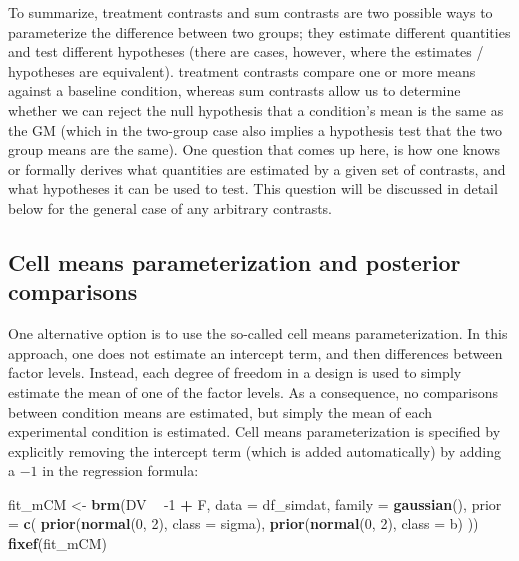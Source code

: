 \documentclass[12pt,]{krantz}
\newenvironment{Shaded}{\begin{snugshade}}{\end{snugshade}}
\newcommand{\KeywordTok}[1]{\textcolor[rgb]{0.13,0.29,0.53}{\textbf{#1}}}
\newcommand{\DataTypeTok}[1]{\textcolor[rgb]{0.13,0.29,0.53}{#1}}
\newcommand{\DecValTok}[1]{\textcolor[rgb]{0.00,0.00,0.81}{#1}}
\newcommand{\StringTok}[1]{\textcolor[rgb]{0.31,0.60,0.02}{#1}}
\newcommand{\OperatorTok}[1]{\textcolor[rgb]{0.81,0.36,0.00}{\textbf{#1}}}
\newcommand{\NormalTok}[1]{#1}
\theoremstyle{definition}
\theoremstyle{definition}
\theoremstyle{definition}
\theoremstyle{remark}
\begin{document}
To summarize, treatment contrasts and sum contrasts are two possible
ways to parameterize the difference between two groups; they estimate
different quantities and test different hypotheses (there are cases,
however, where the estimates / hypotheses are equivalent). treatment
contrasts compare one or more means against a baseline condition,
whereas sum contrasts allow us to determine whether we can reject the
null hypothesis that a condition's mean is the same as the GM (which in
the two-group case also implies a hypothesis test that the two group
means are the same). One question that comes up here, is how one knows
or formally derives what quantities are estimated by a given set of
contrasts, and what hypotheses it can be used to test. This question
will be discussed in detail below for the general case of any arbitrary
contrasts.

\subsection{Cell means parameterization and posterior
comparisons}\label{cell-means-parameterization-and-posterior-comparisons}

One alternative option is to use the so-called cell means
parameterization. In this approach, one does not estimate an intercept
term, and then differences between factor levels. Instead, each degree
of freedom in a design is used to simply estimate the mean of one of the
factor levels. As a consequence, no comparisons between condition means
are estimated, but simply the mean of each experimental condition is
estimated. Cell means parameterization is specified by explicitly
removing the intercept term (which is added automatically) by adding a
\(-1\) in the regression formula:

\begin{Shaded}
\begin{Highlighting}[]
\NormalTok{fit_mCM <-}\StringTok{ }\KeywordTok{brm}\NormalTok{(DV }\OperatorTok{~}\StringTok{ }\DecValTok{-1} \OperatorTok{+}\StringTok{ }\NormalTok{F,}
                 \DataTypeTok{data =}\NormalTok{ df_simdat,}
                 \DataTypeTok{family =} \KeywordTok{gaussian}\NormalTok{(),}
                 \DataTypeTok{prior =} \KeywordTok{c}\NormalTok{(}
                     \KeywordTok{prior}\NormalTok{(}\KeywordTok{normal}\NormalTok{(}\DecValTok{0}\NormalTok{, }\DecValTok{2}\NormalTok{), }\DataTypeTok{class =}\NormalTok{ sigma),}
                     \KeywordTok{prior}\NormalTok{(}\KeywordTok{normal}\NormalTok{(}\DecValTok{0}\NormalTok{, }\DecValTok{2}\NormalTok{), }\DataTypeTok{class =}\NormalTok{ b)}
\NormalTok{                 )) }
\KeywordTok{fixef}\NormalTok{(fit_mCM)}
\end{Highlighting}
\end{Shaded}
\end{document}
